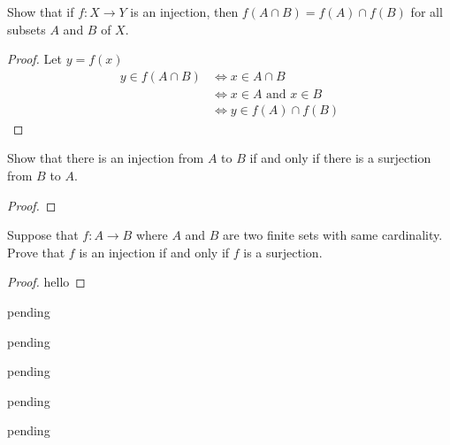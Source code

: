 \begin{exercise} \label{0.45}
	Show that if $f:X \rightarrow Y$ is an injection, then $f(A \cap B)=f(A) \cap f(B)$ for all subsets $A$ and $B$ of $X$.
	
	\begin{proof}
	    Let $y=f(x)$
	    \begin{align*}
	        y \in f(A \cap B) &\Leftrightarrow x \in A \cap B \\
	        &\Leftrightarrow x \in A \text{ and } x \in B \\
	        &\Leftrightarrow  y \in f(A) \cap f(B)
	    \end{align*}
	\end{proof}
\end{exercise}

\begin{exercise} \label{0.46}
	Show that there is an injection from $A$ to $B$ if and only if there is a surjection from $B$ to $A$.
	
	\begin{proof}
	    
	\end{proof}
\end{exercise}

\begin{exercise} \label{0.47}
	Suppose that $f:A \rightarrow B$ where $A$ and $B$ are two finite sets with same cardinality. Prove that $f$ is an injection if and only if $f$ is a surjection. 
	
	\begin{proof}
	    hello
	\end{proof}
\end{exercise}

\begin{exercise} \label{0.48}
	pending
\end{exercise}

\begin{exercise} \label{0.49}
	pending
\end{exercise}

\begin{exercise} \label{0.50}
	pending
\end{exercise}

\begin{exercise} \label{0.51}
	pending
\end{exercise}

\begin{exercise} \label{0.52}
	pending
\end{exercise}

